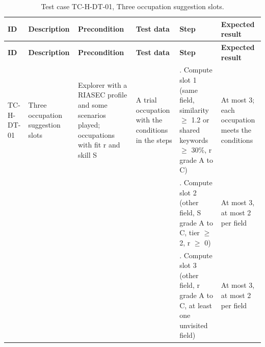 {\footnotesize{}\renewcommand{\arraystretch}{1.1}
\begin{longtable}{|>{\raggedright\arraybackslash}p{}|>{\raggedright\arraybackslash}p{}|>{\raggedright\arraybackslash}p{}|>{\raggedright\arraybackslash}p{}|>{\raggedright\arraybackslash}p{}|>{\raggedright\arraybackslash}p{}|}
\caption{Test case TC-H-DT-01, Three occupation suggestion slots.} \\
\hline
\textbf{ID} & \textbf{Description} & \textbf{Precondition} & \textbf{Test data} & \textbf{Step} & \textbf{Expected result} \\ \hline
\endfirsthead
\hline
\textbf{ID} & \textbf{Description} & \textbf{Precondition} & \textbf{Test data} & \textbf{Step} & \textbf{Expected result} \\ \hline
\endhead
TC-H-DT-01 & Three occupation suggestion slots & Explorer with a RIASEC profile and some scenarios played; occupations with fit r and skill S & A trial occupation with the conditions in the steps & 1. Compute slot 1 (same field, similarity $\geq$ 1.2 or shared keywords $\geq$ 30\%, r grade A to C) & At most 3; each occupation meets the conditions \\ \cline{5-6}
 &  &  &  & 2. Compute slot 2 (other field, S grade A to C, tier $\geq$ 2, r $\geq$ 0) & At most 3, at most 2 per field \\ \cline{5-6}
 &  &  &  & 3. Compute slot 3 (other field, r grade A to C, at least one unvisited field) & At most 3, at most 2 per field \\ \hline
\end{longtable}
}

